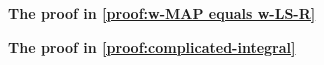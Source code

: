 \begin{appendices}
\begin{question}
    \textbf{The proof in \cref{proof:w-MAP equals w-LS-R}}
\end{question}

\begin{question}
    \textbf{The proof in \cref{proof:complicated-integral}}
\end{question}


\end{appendices}